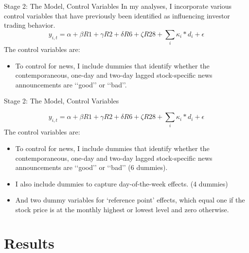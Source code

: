 \documentclass{beamer}
\begin{document}
\begin{frame}{Stage 2: The Model, Control Variables}
    In my analyses, I incorporate various control variables that have previously been identified as influencing investor trading behavior.
    \[
        y_{i,t} = \alpha + \beta R1 + \gamma R2 + \delta R6 + \zeta R28 + \sum_i \kappa_i * d_i + \epsilon
    \]
    The control variables are:
    \begin{itemize}
        \item To control for news, I include dummies that identify whether the contemporaneous, one-day and two-day lagged stock-speciﬁc news announcements are ‘‘good’’ or ‘‘bad’’.
    \end{itemize}

\end{frame}

\begin{frame}{Stage 2: The Model, Control Variables}

    \[
        y_{i,t} = \alpha + \beta R1 + \gamma R2 + \delta R6 + \zeta R28 + \sum_i \kappa_i * d_i + \epsilon
    \]
    The control variables are:
    \begin{itemize}
        \item To control for news, I include dummies that identify whether the contemporaneous, one-day and two-day lagged stock-speciﬁc news announcements are ‘‘good’’ or ‘‘bad’’ (6 dummies).
        \item I also include dummies to capture day-of-the-week effects. (4 dummies)
        \item And two dummy variables for ‘reference point’ eﬀects, which equal one if the stock price is at the monthly highest or lowest level and zero otherwise.
    \end{itemize}

\end{frame}














\section{Results}
\end{document}
